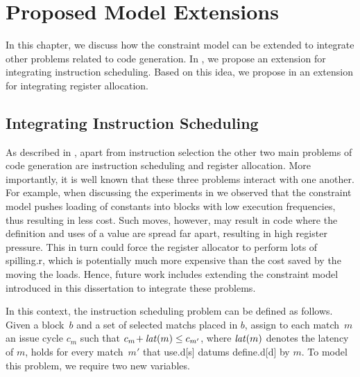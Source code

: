 %

\chapter{Proposed Model Extensions}

In this chapter, we discuss how the \gls{constraint model} can be extended to
integrate other problems related to \gls{code generation}.
%
In , we propose an extension for integrating
\gls{instruction scheduling}.
%
Based on this idea, we propose in  an extension for
integrating \gls{register allocation}.


\section{Integrating Instruction Scheduling}

As described in , apart from \gls{instruction
  selection} the other two main problems of \gls{code generation} are
\gls{instruction scheduling} and \gls{register allocation}.
%
More importantly, it is well known that these three problems interact with one
another.
%
For example, when discussing the experiments in 
we observed that the \gls{constraint model} pushes loading of constants into
\glspl{block} with low execution frequencies, thus resulting in less cost.
%
Such moves, however, may result in code where the definition and uses of a value
are spread far apart, resulting in high \gls{register} pressure.
%
This in turn could force the \gls{register allocator} to perform lots of
\gls{spilling.r}, which is potentially much more expensive than the cost saved
by the moving the loads.
%
Hence, future work includes extending the \gls{constraint model} introduced in
this dissertation to integrate these problems.

In this context, the \gls{instruction scheduling} problem can be defined as
follows.
%
Given a \gls{block}~$b$ and a set of selected \glspl{match} placed in
$b$\hspace{-1pt}, assign to each \gls{match}~$m$ an issue cycle $c_m$ such that
\mbox{$c_m \!+ \operatorname{\textrm{\textit{lat}}}(m) \leq c_{m'}$}, where $\operatorname{\textrm{\textit{lat}}}(m)$ denotes the latency of
$m$\hspace{-1pt}, holds for every \gls{match}~$m'$ that \gls{use.d}[s]
\glspl{datum} \gls{define.d}[d] by $m$\hspace{-1pt}.
%
To model this problem, we require two new \glspl{variable}.


